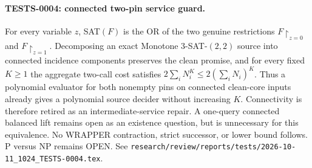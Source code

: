 \paragraph{TESTS-0004: connected two-pin service guard.}
For every variable $z$, SAT$(F)$ is the OR of the two genuine restrictions
$F\upharpoonright_{z=0}$ and $F\upharpoonright_{z=1}$.  Decomposing an exact
Monotone $3$-SAT-$(2,2)$ source into connected incidence components preserves
the clean promise, and for every fixed $K\ge1$ the aggregate two-call cost
satisfies $2\sum_i N_i^K\le2(\sum_iN_i)^K$.  Thus a polynomial evaluator for
both nonempty pins on connected clean-core inputs already gives a polynomial
source decider without increasing $K$.  Connectivity is therefore retired as
an intermediate-service repair.  A one-query connected balanced lift remains
open as an existence question, but is unnecessary for this equivalence.
No WRAPPER contraction, strict successor, or lower bound follows.  P versus
NP remains OPEN.  See
\texttt{research/review/reports/tests/2026-10-11\_1024\_TESTS-0004.tex}.
